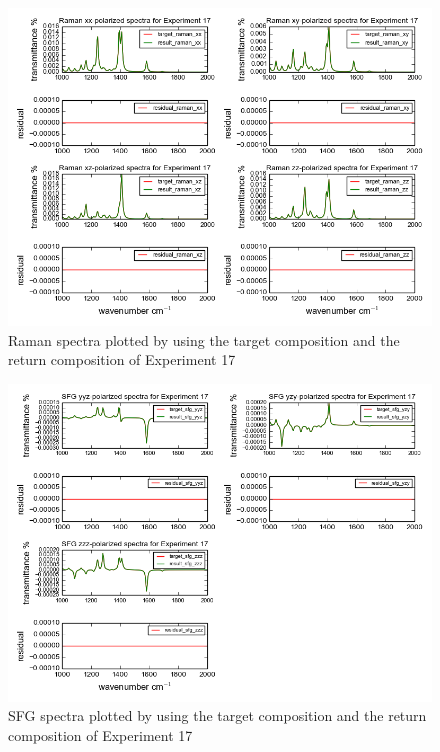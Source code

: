 \begin{figure}[!ht] 
\centering
\includegraphics[scale=0.7]{Figures/chapter4_result_target_plotting_5datapoint_raman.png}
\caption{Raman spectra plotted by using the target composition and the return composition of Experiment 17} \label{fig:4.3}
\end{figure}

\begin{figure}[!ht]
\centering
\includegraphics[scale=0.7]{Figures/chapter4_result_target_plotting_5datapoint_sfg.png}
\caption{SFG spectra plotted by using the target composition and the return composition of Experiment 17}  \label{fig:4.4}
\end{figure}


